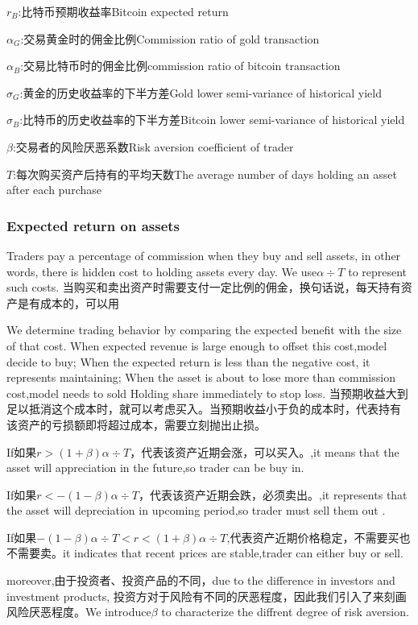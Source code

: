 \documentclass{mcmthesis}
\begin{document}
$r_B$:比特币预期收益率Bitcoin expected return

$\alpha _G$:交易黄金时的佣金比例Commission ratio of gold transaction

$\alpha _B$:交易比特币时的佣金比例commission ratio of bitcoin transaction

$\sigma _G$:黄金的历史收益率的下半方差Gold lower semi-variance of historical yield

$\sigma _B$:比特币的历史收益率的下半方差Bitcoin lower semi-variance of historical yield

$\beta $:交易者的风险厌恶系数Risk aversion coefficient of trader

$T$:每次购买资产后持有的平均天数The average number of days holding an asset after each purchase 



\subsubsection{Expected return on assets}
Traders pay a percentage of commission when they buy and sell assets, in other words, there is hidden cost to holding assets every day.
We use$\alpha \div T$ to represent such costs.
当购买和卖出资产时需要支付一定比例的佣金，换句话说，每天持有资产是有成本的，可以用%

We determine trading behavior by comparing the expected benefit with the size of that cost.
When expected revenue is large enough to offset this cost,model decide to buy;
When the expected return is less than the negative cost, it represents maintaining;
When the asset is about to lose more than commission cost,model needs to sold Holding share immediately to stop loss.
当预期收益大到足以抵消这个成本时，就可以考虑买入。当预期收益小于负的成本时，代表持有
该资产的亏损额即将超过成本，需要立刻抛出止损。

If如果$r>(1+\beta )\alpha \div T$，代表该资产近期会涨，可以买入。,it means that the asset will appreciation in the future,so trader can be buy in.

If如果$r<-(1-\beta )\alpha \div T$，代表该资产近期会跌，必须卖出。,it represents that the asset will depreciation in upcoming period,so trader must sell them out .

If如果$-(1-\beta )\alpha \div T<r<(1+\beta )\alpha \div T$,代表资产近期价格稳定，不需要买也不需要卖。it indicates that recent prices are stable,trader can either buy or sell.


moreover,由于投资者、投资产品的不同，due to the difference in investors and investment products,
投资方对于风险有不同的厌恶程度，因此我们引入了来刻画风险厌恶程度。We introduce$\beta $ to characterize the diffrent degree of risk aversion.
\end{document}
